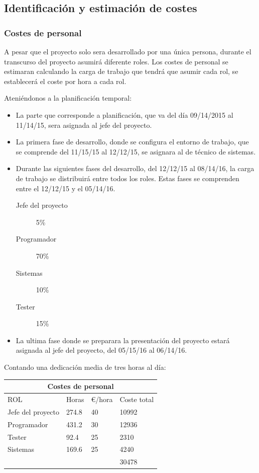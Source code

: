 \documentclass[12pt]{article} %
\begin{document}
\subsection{Identificación y estimación de costes}
\subsubsection{Costes de personal}
A pesar que el proyecto solo sera desarrollado por una única persona, durante el transcurso del proyecto asumirá diferente roles. Los costes de personal se estimaran calculando la carga de trabajo que tendrá que asumir cada rol, se establecerá el coste por hora a cada rol.

Ateniéndonos a la planificación temporal:
\begin{itemize}
\item La parte que corresponde a planificación, que va del día 09/14/2015 al 11/14/15, sera asignada al jefe del proyecto.
\item La primera fase de desarrollo, donde se configura el entorno de trabajo, que se comprende del 11/15/15 al 12/12/15, se asignara al de técnico de sistemas.
\newpage
\item Durante las siguientes fases del desarrollo, del 12/12/15 al 08/14/16, la carga de trabajo se distribuirá entre todos los roles. Estas fases se comprenden entre el 12/12/15 y el 05/14/16.
\begin{description}
\item[Jefe del proyecto] 5\%
\item[Programador] 70\%
\item[Sistemas] 10\%
\item[Tester] 15\%
\end{description}
\item La ultima fase donde se preparara la presentación del proyecto estará asignada al jefe del proyecto, del 05/15/16 al 06/14/16.
\end{itemize}
Contando una dedicación media de tres horas al día:


\setlength{\arrayrulewidth}{1mm}
\setlength{\tabcolsep}{12pt}
\renewcommand{\arraystretch}{2.5}
{
\begin{tabular}{ |p{2cm}|p{2cm}|p{2cm}|p{2cm}|}
\hline
\multicolumn{4}{|c|}{Costes de personal} \\
\hline
ROL &Horas & \euro /hora &Coste total \\
\hline
Jefe del proyecto &274.8 &40 & 10992\\
Programador &431.2 &30 & 12936\\
Tester &92.4 &25 & 2310\\
Sistemas &169.6 &25 &4240\\
&&& 30478\\
\hline
\end{tabular}
}
\newpage
\end{document}
